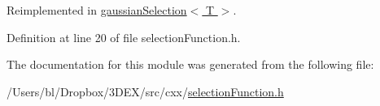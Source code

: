 Reimplemented in \hyperlink{modulegaussian_selection_ae3b45a04b50c4d6bd3444eb65430b1f7}{gaussianSelection$<$ T $>$}.



Definition at line 20 of file selectionFunction.h.



The documentation for this module was generated from the following file:\begin{DoxyCompactItemize}
\item 
/Users/bl/Dropbox/3DEX/src/cxx/\hyperlink{selection_function_8h}{selectionFunction.h}\end{DoxyCompactItemize}
